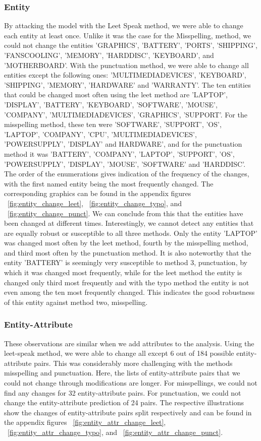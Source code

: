 \subsubsection{Entity}
By attacking the model with the Leet Speak method, we were able to change each entity at least once. Unlike it was the case for the Misspelling,  method, we could not change the entities 'GRAPHICS', 'BATTERY', 'PORTS', 'SHIPPING', 'FANS\textunderscore COOLING', 'MEMORY', 'HARD\textunderscore DISC', 'KEYBOARD', and 'MOTHERBOARD'. With the punctuation method, we were able to change all entities except the following ones: 'MULTIMEDIA\textunderscore DEVICES', 'KEYBOARD', 'SHIPPING', 'MEMORY', 'HARDWARE' and 'WARRANTY'. 
The ten entities that could be changed most often using the leet method are 'LAPTOP', 'DISPLAY', 'BATTERY', 'KEYBOARD', 'SOFTWARE', 'MOUSE', 'COMPANY', 'MULTIMEDIA\textunderscore DEVICES', 'GRAPHICS', 'SUPPORT'. For the misspelling method, these ten were 'SOFTWARE', 'SUPPORT', 'OS', 'LAPTOP', 'COMPANY', 'CPU', 'MULTIMEDIA\textunderscore DEVICES', 'POWER\textunderscore SUPPLY', 'DISPLAY' and HARDWARE', and for the punctuation method it was 'BATTERY', 'COMPANY', 'LAPTOP', 'SUPPORT', 'OS', 'POWER\textunderscore SUPPLY', 'DISPLAY', 'MOUSE', 'SOFTWARE' and 'HARD\textunderscore DISC'. The order of the enumerations gives indication of the frequency of the changes, with the first named entity being the most frequently changed. The corresponding graphics can be found in the appendix figures ~\ref{fig:entity_change_leet}, ~\ref{fig:entity_change_typo}, and ~\ref{fig:entity_change_punct}. 
We can conclude from this that the entities have been changed at different times.  Interestingly, we cannot detect any entities that are equally robust or susceptible to all three methods. Only the entity 'LAPTOP' was changed most often by the leet method, fourth by the misspelling method, and third most often by the punctuation method. It is also noteworthy that the entity 'BATTERY' is seemingly very susceptible to method 3, punctuation, by which it was changed most frequently, while for the leet method the entity is changed only third most frequently and with the typo method the entity is not even among the ten most frequently changed. This indicates the good robustness of this entity against method two, misspelling. 

\subsubsection{Entity-Attribute}
These observations are similar when we add attributes to the analysis. Using the leet-speak method, we were able to change all except 6 out of 184 possible entity-attribute pairs. This was considerably more challenging with the methods misspelling and punctuation. Here, the lists of entity-attribute pairs that we could not change through modifications are longer. For misspellings, we could not find any changes for 32 entity-attribute pairs. For punctuation, we could not change the entity-attribute prediction of 24 pairs. The respective illustrations show the changes of entity-attribute pairs split respectively and can be found in the appendix figures ~\ref{fig:entity_attr_change_leet}, ~\ref{fig:entity_attr_change_typo}, and ~\ref{fig:entity_attr_change_punct}.

